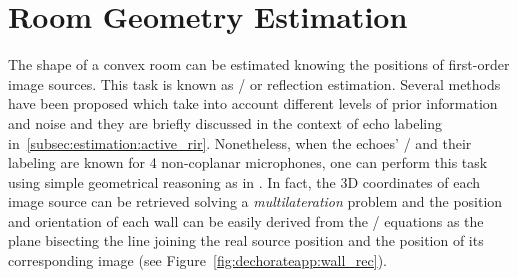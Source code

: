 \section{Room Geometry Estimation}\label{sec:dechorateapp:rooge}

The shape of a convex room can be estimated knowing the positions of first-order image sources.
This task is known as \RooGE/ or reflection estimation.
Several methods have been proposed which take into account different levels of prior information and noise and they are briefly discussed in the context of echo labeling in~\cref{subsec:estimation:active_rir}.
Nonetheless, when the echoes' \TOAs/ and their labeling are known for 4 non-coplanar microphones, one can perform this task using simple geometrical reasoning as in .
In fact, the 3D coordinates of each image source can be retrieved solving a \textit{multilateration} problem  and the position and orientation of each wall can be easily derived from the \ISM/ equations as the plane bisecting the line joining the real source position and the position of its corresponding image (see Figure~\ref{fig:dechorateapp:wall_rec}).

